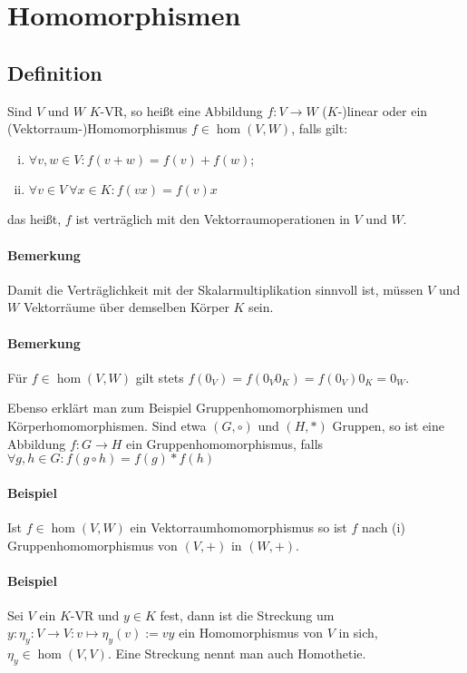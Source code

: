 \section{Homomorphismen}
\subsection{Definition}
	\begin{Definition}[Homomorphismus]
		Sind $ V $ und $ W $ $ K $-VR, so heißt eine Abbildung $f: V \rightarrow W$ ($ K $-)linear oder ein (Vektorraum-)Homomorphismus $f\in \hom(V,W)$, falls gilt:
	

\begin{enumerate}[(i)]
	\item $\forall v,w \in V: f(v+w) = f(v) + f(w)$;
	\item $\forall v\in V\ \forall x\in K: f(vx) = f(v)x$
\end{enumerate}

    das heißt, $ f $ ist verträglich mit den Vektorraumoperationen in $ V $ und $ W $.
	\end{Definition}
\paragraph{Bemerkung}
	Damit die Verträglichkeit mit der Skalarmultiplikation sinnvoll ist, müssen $ V $ und $ W $ Vektorräume über demselben Körper $ K $ sein.

\paragraph{Bemerkung}
	Für $f\in \hom(V,W)$ gilt stets $f(0_V) = f(0_V0_K) = f(0_V)0_K = 0_W$.
  
  Ebenso erklärt man zum Beispiel Gruppenhomomorphismen und Körperhomomorphismen. Sind etwa $(G,\circ)$ und $(H,*)$ Gruppen, so ist eine Abbildung $f: G \to H$ ein Gruppenhomomorphismus, falls $\forall g,h \in G: f(g\circ h) = f(g) * f(h)$
  
\paragraph{Beispiel}
	Ist $f\in \hom(V,W)$ ein Vektorraumhomomorphismus so ist $ f $ nach (i) Gruppenhomomorphismus von $ (V,+) $ in $ (W,+) $.
  
\paragraph{Beispiel}
	Sei $ V $ ein $ K $-VR und $y\in K$ fest, dann ist die Streckung um $y: \eta_y:V\to V: v\mapsto \eta_y(v) := vy$ ein Homomorphismus von $ V $ in sich, $\eta_y\in \hom(V,V)$. Eine Streckung nennt man auch Homothetie.
  	
